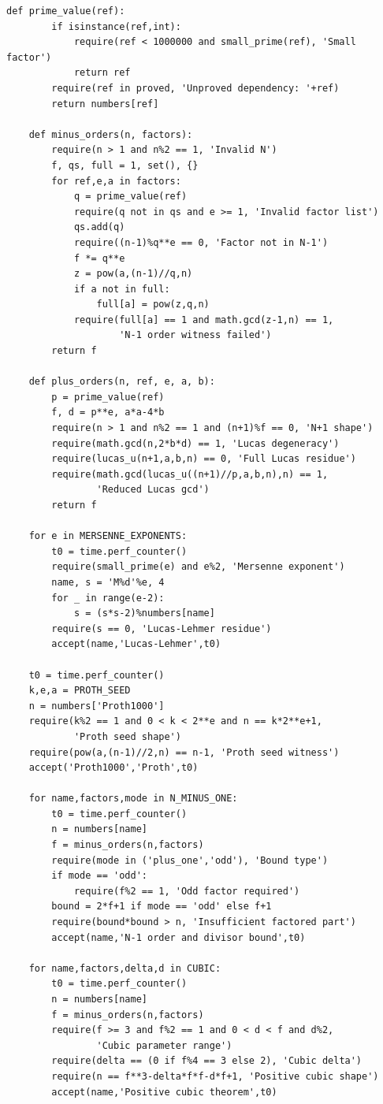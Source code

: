 \documentclass[11pt,a4paper]{article}
\theoremstyle{definition}\newtheorem{definition}[theorem]{Definition}
\theoremstyle{remark}\newtheorem{remark}[theorem]{Remark}
\begin{document}
\begin{lstlisting}[label=lst:verifier]
    def prime_value(ref):
        if isinstance(ref,int):
            require(ref < 1000000 and small_prime(ref), 'Small factor')
            return ref
        require(ref in proved, 'Unproved dependency: '+ref)
        return numbers[ref]

    def minus_orders(n, factors):
        require(n > 1 and n%2 == 1, 'Invalid N')
        f, qs, full = 1, set(), {}
        for ref,e,a in factors:
            q = prime_value(ref)
            require(q not in qs and e >= 1, 'Invalid factor list')
            qs.add(q)
            require((n-1)%q**e == 0, 'Factor not in N-1')
            f *= q**e
            z = pow(a,(n-1)//q,n)
            if a not in full:
                full[a] = pow(z,q,n)
            require(full[a] == 1 and math.gcd(z-1,n) == 1,
                    'N-1 order witness failed')
        return f

    def plus_orders(n, ref, e, a, b):
        p = prime_value(ref)
        f, d = p**e, a*a-4*b
        require(n > 1 and n%2 == 1 and (n+1)%f == 0, 'N+1 shape')
        require(math.gcd(n,2*b*d) == 1, 'Lucas degeneracy')
        require(lucas_u(n+1,a,b,n) == 0, 'Full Lucas residue')
        require(math.gcd(lucas_u((n+1)//p,a,b,n),n) == 1,
                'Reduced Lucas gcd')
        return f

    for e in MERSENNE_EXPONENTS:
        t0 = time.perf_counter()
        require(small_prime(e) and e%2, 'Mersenne exponent')
        name, s = 'M%d'%e, 4
        for _ in range(e-2):
            s = (s*s-2)%numbers[name]
        require(s == 0, 'Lucas-Lehmer residue')
        accept(name,'Lucas-Lehmer',t0)

    t0 = time.perf_counter()
    k,e,a = PROTH_SEED
    n = numbers['Proth1000']
    require(k%2 == 1 and 0 < k < 2**e and n == k*2**e+1,
            'Proth seed shape')
    require(pow(a,(n-1)//2,n) == n-1, 'Proth seed witness')
    accept('Proth1000','Proth',t0)

    for name,factors,mode in N_MINUS_ONE:
        t0 = time.perf_counter()
        n = numbers[name]
        f = minus_orders(n,factors)
        require(mode in ('plus_one','odd'), 'Bound type')
        if mode == 'odd':
            require(f%2 == 1, 'Odd factor required')
        bound = 2*f+1 if mode == 'odd' else f+1
        require(bound*bound > n, 'Insufficient factored part')
        accept(name,'N-1 order and divisor bound',t0)

    for name,factors,delta,d in CUBIC:
        t0 = time.perf_counter()
        n = numbers[name]
        f = minus_orders(n,factors)
        require(f >= 3 and f%2 == 1 and 0 < d < f and d%2,
                'Cubic parameter range')
        require(delta == (0 if f%4 == 3 else 2), 'Cubic delta')
        require(n == f**3-delta*f*f-d*f+1, 'Positive cubic shape')
        accept(name,'Positive cubic theorem',t0)


\end{lstlisting}
\end{document}

